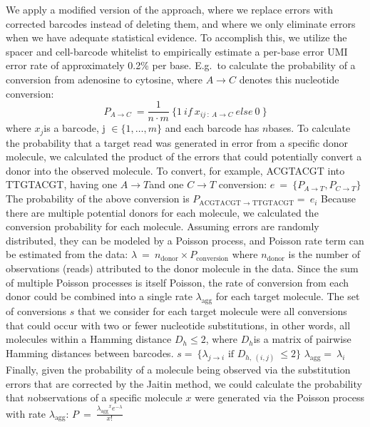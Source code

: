We apply a modified version of the \citep{Jaitin2014} approach, where we replace errors with corrected barcodes instead of deleting them, and where we only eliminate errors when we have adequate statistical evidence. 
To accomplish this, we utilize the spacer and cell-barcode whitelist to empirically estimate a per-base error UMI error rate of approximately 0.2\% per base. 
E.g.\ to calculate the probability of a conversion from adenosine to cytosine, where \(A \rightarrow C\) denotes this nucleotide conversion:
\[P_{A \rightarrow C}\  = \frac{1}{n \cdot m}\ \{ 1\ if\ x_{ij\ :\ A \rightarrow C}\ else\ 0\ \}\]
where \(x_{j}\)is a barcode, \(\text{j\ } \in \{ 1,\ldots,m\}\) and each barcode has \(n\)bases.
To calculate the probability that a target read was generated in error from a specific donor molecule, we calculated the product of the errors that could potentially convert a donor into the observed molecule. 
To convert, for example, ACGTACGT into TTGTACGT, having one \(A \rightarrow T\)and one \(C \rightarrow T\) conversion:
\(e\  = \ \{ P_{A \rightarrow T},P_{C \rightarrow T}\}\ \)
The probability of the above conversion is
\(P_{\text{ACGTACGT\ } \rightarrow \text{\ TTGTACGT}} = \ e_{i}\)
Because there are multiple potential donors for each molecule, we calculated the conversion probability for each molecule. 
Assuming errors are randomly distributed, they can be modeled by a Poisson process, and Poisson rate term can be estimated from the data:
\(\lambda\  = \ n_{\text{donor}} \times P_{\text{conversion}}\)
where \(n_{\text{donor}}\) is the number of observations (reads) attributed to the donor molecule in the data. 
Since the sum of multiple Poisson processes is itself Poisson, the rate of conversion from each donor could be combined into a single rate \(\lambda_{\text{agg}}\) for each target molecule. 
The set of conversions \(s\) that we consider for each target molecule were all conversions that could occur with two or fewer nucleotide substitutions, in other words, all molecules within a Hamming distance \(D_{h} \leq 2\), where \(D_{h}\)is a matrix of pairwise Hamming distances between barcodes.
\(s = \ \{\lambda_{j \rightarrow i}\text{\ if\ }D_{h,\ (i,j)}\  \leq 2\}\)
\(\lambda_{\text{agg}} = \ \lambda_{i}\)
Finally, given the probability of a molecule being observed via the substitution errors that are corrected by the Jaitin method, we could calculate the probability that \(n\)observations of a specific molecule \(x\) were generated via the Poisson process with rate \(\lambda_{\text{agg}}\):
\(P\  = \ \frac{{\lambda_{\text{agg}}}^{x}e^{- \lambda}}{x!}\)

